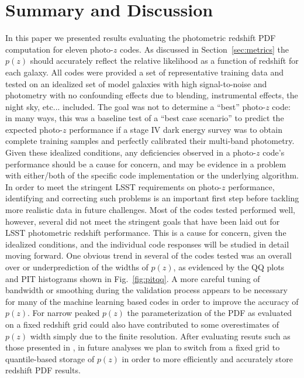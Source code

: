 \documentclass[usenatbib]{mn2e}
\begin{document}
\section{Summary and Discussion}
\label{sec:discussion}
In this paper we presented results evaluating the photometric redshift PDF computation for eleven photo-$z$ codes.  As discussed in Section~\ref{sec:metrics} the $p(z)$ should accurately reflect the relative likelihood as a function of redshift for each galaxy.  All codes were provided a set of representative training data and tested on an idealized set of model galaxies with high signal-to-noise and photometry with no confounding effects due to blending, instrumental effects, the night sky, etc... included.  The goal was not to determine a ``best'' photo-$z$ code: in many ways, this was a baseline test of a ``best case scenario'' to predict the expected photo-$z$ performance if a stage IV dark energy survey was to obtain complete training samples and perfectly calibrated their multi-band photometry.  Given these idealized conditions, any deficiencies observed in a photo-$z$ code's performance should be a cause for concern, and may be evidence in a problem with either/both of the specific code implementation or the underlying algorithm.  In order to meet the stringent LSST requirements on photo-$z$ performance, identifying and correcting such problems is an important first step before tackling more realistic data in future challenges.  Most of the codes tested performed well, however, several did not meet the stringent goals that have been laid out for LSST photometric redshift performance.  This is a cause for concern, given the idealized conditions, and the individual code responses will be studied in detail moving forward.  One obvious trend in several of the codes tested was an overall over or underprediction of the widths of $p(z)$, as evidenced by the QQ plots and PIT histograms shown in Fig.~\ref{fig:pitqq}.  A more careful tuning of bandwidth or smoothing during the validation process appears to be necessary for many of the machine learning based codes in order to improve the accuracy of $p(z)$.  For narrow peaked $p(z)$ the parameterization of the PDF as evaluated on a fixed redshift grid could also have contributed to some overestimates of $p(z)$ width simply due to the finite resolution.  After evaluating resuts such as those presented in \citet[]{Malz:qp}, in future analyses we plan to switch from a fixed grid to quantile-based storage of $p(z)$ in order to more efficiently and accurately store redshift PDF results.
\end{document}
